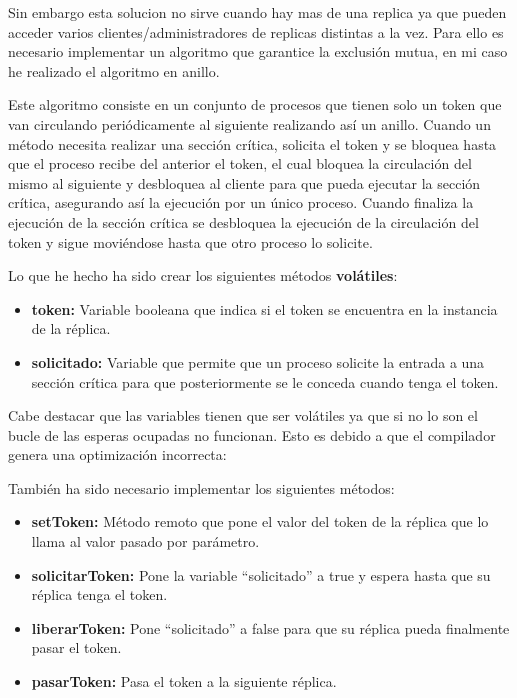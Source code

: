 \documentclass{article}
\begin{document}
Sin embargo esta solucion no sirve cuando hay mas de una replica ya que pueden acceder varios clientes/administradores de replicas distintas a la vez. Para ello es necesario implementar un algoritmo que garantice la exclusión mutua, en mi caso he realizado el algoritmo en anillo.

Este algoritmo consiste en un conjunto de procesos que tienen solo un token que van circulando periódicamente al siguiente realizando así un anillo. Cuando un método necesita realizar una sección crítica, solicita el token y se bloquea hasta que el proceso recibe del anterior el token, el cual bloquea la circulación del mismo al siguiente y desbloquea al cliente para que pueda ejecutar la sección crítica, asegurando así la ejecución por un único proceso. Cuando finaliza la ejecución de la sección crítica se desbloquea la ejecución de la circulación del token y sigue moviéndose hasta que otro proceso lo solicite.

Lo que he hecho ha sido crear los siguientes métodos \textbf{volátiles}:

\begin{itemize}
    \item \textbf{token: }Variable booleana que indica si el token se encuentra en la instancia de la réplica.
    \item \textbf{solicitado: }Variable que permite que un proceso solicite la entrada a una sección crítica para que posteriormente se le conceda cuando tenga el token.
\end{itemize}

Cabe destacar que las variables tienen que ser volátiles ya que si no lo son el bucle de las esperas ocupadas no funcionan. Esto es debido a que el compilador genera una optimización incorrecta:



También ha sido necesario implementar los siguientes métodos:

\begin{itemize}
    \item \textbf{setToken: }Método remoto que pone el valor del token de la réplica que lo llama al valor pasado por parámetro.
    \item \textbf{solicitarToken: }Pone la variable ``solicitado'' a true y espera hasta que su réplica tenga el token.
    \item \textbf{liberarToken: }Pone ``solicitado'' a false para que su réplica pueda finalmente pasar el token.
    \item \textbf{pasarToken: }Pasa el token a la siguiente réplica.
\end{itemize}
\end{document}
